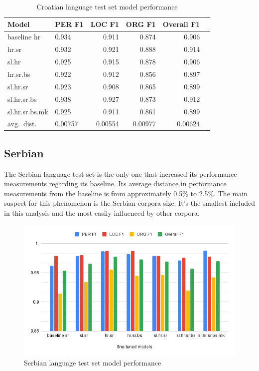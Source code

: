 \documentclass[sigconf]{acmart}
\begin{document}
\begin{table}[H]
  \caption{Croatian language test set model performance}
  \label{tab:eval_hr}
  \begin{tabular}{llrrrr}
    \toprule
    Model&PER F1&LOC F1&ORG F1&Overall F1\\
    \midrule
    baseline hr&0.934&0.911&0.874&0.906\\
    \midrule
    hr.sr&0.932&0.921&0.888&0.914\\
    sl.hr&0.925&0.915&0.878&0.906\\
    hr.sr.bs&0.922&0.912&0.856&0.897\\
    sl.hr.sr&0.923&0.908&0.865&0.899\\
    sl.hr.sr.bs&0.938&0.927&0.873&0.912\\
    sl.hr.sr.bs.mk&0.925&0.911&0.861&0.899\\
    \midrule
    avg.\ dist.&0.00757&0.00554&0.00977&0.00624\\
    \bottomrule
  \end{tabular}
\end{table}

\subsection{Serbian}
\label{subsec:serbian}
The Serbian language test set is the only one that increased its performance measurements regarding its baseline.
Its average distance in performance measurements from the baseline is from approximately 0.5\% to 2.5\%.
The main suspect for this phenomenon is the Serbian corpora size.
It's the smallest included in this analysis and the most easily influenced by other corpora.
\begin{figure}[h]
  \caption{Serbian language test set model performance}
  \label{fig:eval_sr}
  \centering
  \includegraphics[width=\linewidth]{eval_sr}
\end{figure}
\end{document}
